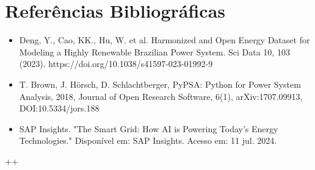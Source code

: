 \documentclass[a4paper,12pt]{article}
\begin{document}
\section{Referências Bibliográficas}
\begin{itemize}
    \item Deng, Y., Cao, KK., Hu, W. et al. Harmonized and Open Energy Dataset for Modeling a Highly Renewable Brazilian Power System. Sci Data 10, 103 (2023). https://doi.org/10.1038/s41597-023-01992-9
    \item T. Brown, J. Hörsch, D. Schlachtberger, PyPSA: Python for Power System Analysis, 2018, Journal of Open Research Software, 6(1), arXiv:1707.09913, DOI:10.5334/jors.188
    \item SAP Insights. "The Smart Grid: How AI is Powering Today’s Energy Technologies." Disponível em: SAP Insights. Acesso em: 11 jul. 2024.
\end{itemize}
++
\end{document}
